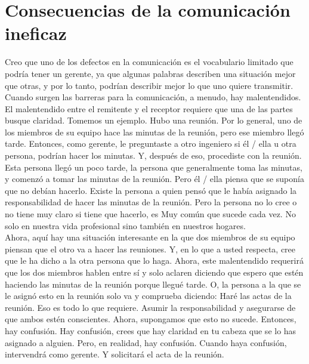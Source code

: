 \documentclass[10pt]{book}
\begin{document}
\section{Consecuencias de la comunicación ineficaz}
Creo que uno de los defectos en la comunicación es el vocabulario limitado que podría tener un gerente, ya que algunas palabras describen una situación mejor que otras, y por lo tanto, podrían describir mejor lo que uno quiere transmitir.\\
Cuando surgen las barreras para la comunicación, a menudo, hay malentendidos. El malentendido entre el remitente y el receptor requiere que una de las partes busque claridad. Tomemos un ejemplo. Hubo una reunión. Por lo general, uno de los miembros de su equipo hace las minutas de la reunión, pero ese miembro llegó tarde. Entonces, como gerente, le preguntaste a otro ingeniero si él / ella u otra persona, podrían hacer los minutas. Y, después de eso, procediste con la reunión. Esta persona llegó un poco tarde, la persona que generalmente toma las minutas, y comenzó a tomar las minutas de la reunión. Pero él / ella piensa que se suponía que no debían hacerlo. Existe la persona a quien pensó que le había asignado la responsabilidad de hacer las minutas de la reunión. Pero la persona no lo cree o no tiene muy claro si tiene que hacerlo, es Muy común que sucede cada vez. No solo en nuestra vida profesional sino también en nuestros hogares.\\
Ahora, aquí hay una situación interesante en la que dos miembros de su equipo piensan que el otro va a hacer las reuniones. Y, en lo que a usted respecta, cree que le ha dicho a la otra persona que lo haga. Ahora, este malentendido requerirá que los dos miembros hablen entre sí y solo aclaren diciendo que espero que estén haciendo las minutas de la reunión porque llegué tarde. O, la persona a la que se le asignó esto en la reunión solo va y comprueba diciendo: Haré las actas de la reunión. Eso es todo lo que requiere. Asumir la responsabilidad y asegurarse de que ambos estén conscientes. Ahora, supongamos que esto no sucede. Entonces, hay confusión. Hay confusión, crees que hay claridad en tu cabeza que se lo has asignado a alguien. Pero, en realidad, hay confusión. Cuando haya confusión, intervendrá como gerente. Y solicitará el acta de la reunión.\\
\end{document}
